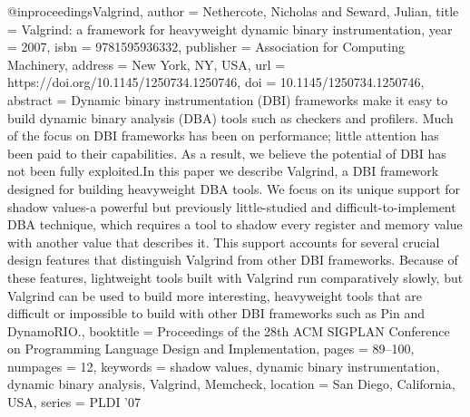 {@inproceedings{Valgrind,
author = {Nethercote, Nicholas and Seward, Julian},
title = {Valgrind: a framework for heavyweight dynamic binary instrumentation},
year = {2007},
isbn = {9781595936332},
publisher = {Association for Computing Machinery},
address = {New York, NY, USA},
url = {https://doi.org/10.1145/1250734.1250746},
doi = {10.1145/1250734.1250746},
abstract = {Dynamic binary instrumentation (DBI) frameworks make it easy to build dynamic binary analysis (DBA) tools such as checkers and profilers. Much of the focus on DBI frameworks has been on performance; little attention has been paid to their capabilities. As a result, we believe the potential of DBI has not been fully exploited.In this paper we describe Valgrind, a DBI framework designed for building heavyweight DBA tools. We focus on its unique support for shadow values-a powerful but previously little-studied and difficult-to-implement DBA technique, which requires a tool to shadow every register and memory value with another value that describes it. This support accounts for several crucial design features that distinguish Valgrind from other DBI frameworks. Because of these features, lightweight tools built with Valgrind run comparatively slowly, but Valgrind can be used to build more interesting, heavyweight tools that are difficult or impossible to build with other DBI frameworks such as Pin and DynamoRIO.},
booktitle = {Proceedings of the 28th ACM SIGPLAN Conference on Programming Language Design and Implementation},
pages = {89–100},
numpages = {12},
keywords = {shadow values, dynamic binary instrumentation, dynamic binary analysis, Valgrind, Memcheck},
location = {San Diego, California, USA},
series = {PLDI '07}
}


}
